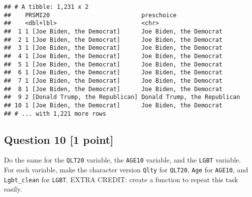 \documentclass[
]{article}
\begin{document}
\begin{verbatim}
## # A tibble: 1,231 x 2
##    PRSMI20                          preschoice                  
##    <dbl+lbl>                        <chr>                       
##  1 1 [Joe Biden, the Democrat]      Joe Biden, the Democrat     
##  2 1 [Joe Biden, the Democrat]      Joe Biden, the Democrat     
##  3 1 [Joe Biden, the Democrat]      Joe Biden, the Democrat     
##  4 1 [Joe Biden, the Democrat]      Joe Biden, the Democrat     
##  5 1 [Joe Biden, the Democrat]      Joe Biden, the Democrat     
##  6 1 [Joe Biden, the Democrat]      Joe Biden, the Democrat     
##  7 1 [Joe Biden, the Democrat]      Joe Biden, the Democrat     
##  8 1 [Joe Biden, the Democrat]      Joe Biden, the Democrat     
##  9 2 [Donald Trump, the Republican] Donald Trump, the Republican
## 10 1 [Joe Biden, the Democrat]      Joe Biden, the Democrat     
## # ... with 1,221 more rows
\end{verbatim}

\hypertarget{question-10-1-point}{%
\subsection{Question 10 {[}1 point{]}}\label{question-10-1-point}}

Do the same for the \texttt{QLT20} variable, the \texttt{AGE10}
variable, and the \texttt{LGBT} variable. For each variable, make the
character version \texttt{Qlty} for \texttt{QLT20}, \texttt{Age} for
\texttt{AGE10}, and \texttt{Lgbt\_clean} for \texttt{LGBT}. EXTRA
CREDIT: create a function to repeat this task easily.
\end{document}
